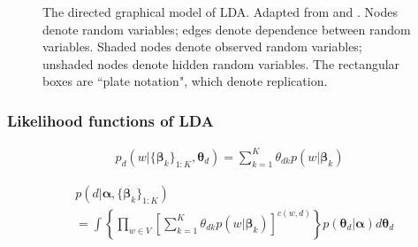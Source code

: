 \documentclass{article}
\begin{document}
\begin{figure}
  \centering
  \caption{The directed graphical model of LDA. Adapted from \cite{blei2012probablistic} and \cite{blei2009topic}. Nodes denote random variables; edges denote dependence between random variables. Shaded nodes denote observed random variables; unshaded nodes denote hidden random variables. The rectangular boxes are ``plate notation", which denote replication.}
  \label{fig:gaphical_model_lda}
\end{figure}


\subsubsection{Likelihood functions of LDA}

\begin{align}
  p_d(w | \{\boldsymbol{\beta}_k\}_{1:K}, \boldsymbol{\theta}_d) = \sum_{k = 1}^K \theta_{dk} p(w | \boldsymbol{\beta}_k)
\end{align}

\begin{align}
  & p(d | \boldsymbol{\alpha}, \{\boldsymbol{\beta}_k\}_{1:K}) \\
  & = \int \left\{ \prod_{w \in V} \left[ \sum_{k = 1}^K \theta_{dk} p(w | \boldsymbol{\beta}_k) \right]^{c(w,d)} \right\} p(\boldsymbol{\theta}_d | \boldsymbol{\alpha}) d\boldsymbol{\theta}_d
\end{align}
\end{document}
